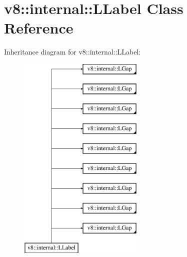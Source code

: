 \hypertarget{classv8_1_1internal_1_1_l_label}{}\section{v8\+:\+:internal\+:\+:L\+Label Class Reference}
\label{classv8_1_1internal_1_1_l_label}
Inheritance diagram for v8\+:\+:internal\+:\+:L\+Label\+:\begin{figure}[H]
\begin{center}
\leavevmode
\includegraphics[height=10.000000cm]{classv8_1_1internal_1_1_l_label}
\end{center}
\end{figure}
